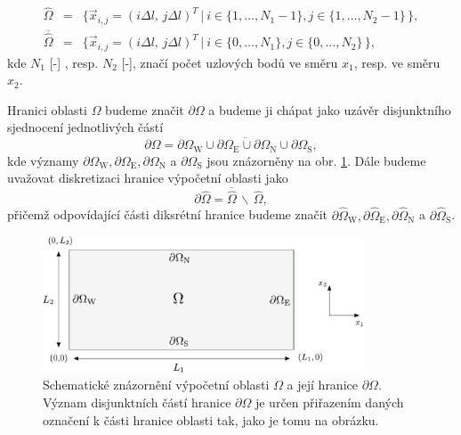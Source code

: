 \begin{subequations}\label{eq:oblast}
	\begin{eqnarray}
	\hat{\Omega} &=& \big\{ \vec{x}_{i,j} = (i \Delta l,\,j \Delta l)^T \, \big| \ i \in \{1, \dots, N_{1} - 1\}, j \in \{1, \dots, N_{2} - 1 \} \, \big\},\\[4pt]
	\overline{\hat{\Omega}} &=& \big\{ \vec{x}_{i,j} = (i \Delta l,\,j \Delta l)^T \, \big| \ i \in \{0, \dots, N_{1} \}, j \in \{0, \dots, N_{2} \} \, \big\},
	\end{eqnarray}
\end{subequations}
kde $ N_{1}$ [-] , resp. $ N_{2} $ [-], značí počet uzlových bodů ve směru $ x_1 $, resp. ve směru $x_2$.

Hranici oblasti $ \Omega $ budeme značit $ \partial \Omega $ a budeme ji chápat jako uzávěr disjunktního sjednocení jednotlivých částí 
\begin{equation}\label{eq:border decomposition}
\partial \Omega = \overline{\partial \Omega_{\mathrm{W}} \cup \partial \Omega_{\mathrm{E}} \cup \partial \Omega_{\mathrm{N}} \cup \partial \Omega_{\mathrm{S}}},
\end{equation}
kde významy $ \partial \Omega_{\mathrm{W}} , \partial \Omega_{\mathrm{E}} , \partial \Omega_{\mathrm{N}} $ a $ \partial \Omega_{\mathrm{S}}$ jsou znázorněny na obr. \ref{fig:oblast}. Dále budeme uvažovat diskretizaci hranice výpočetní oblasti jako
\begin{equation}\label{eq:border}
\partial\hat{\Omega} = \overline{\hat{\Omega}} \, \backslash \, \hat{\Omega},
\end{equation}
přičemž odpovídající části diksrétní hranice budeme značit $ \partial \hat{\Omega}_{\mathrm{W}} , \partial \hat{\Omega}_{\mathrm{E}} , \partial \hat{\Omega}_{\mathrm{N}} $ a $ \partial \hat{\Omega}_{\mathrm{S}}$.
\begin{figure}[H]
	\centering
	\includegraphics[width=0.85\textwidth]{Images/oblast.pdf}
	\caption{Schematické znázornění výpočetní oblasti $ \Omega $ a její hranice $ \partial \Omega $. Význam disjunktních částí hranice $ \partial \Omega$ je určen přiřazením daných označení k části hranice oblasti tak, jako je tomu na obrázku.}  
	\label{fig:oblast}
	\vspace{1.8mm}
\end{figure}

